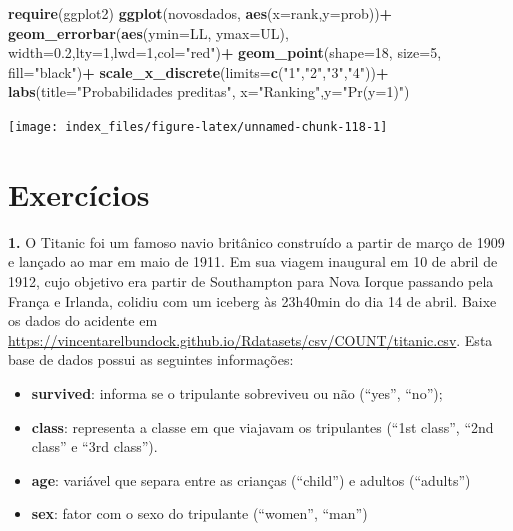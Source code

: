 \documentclass[12pt,brazil,oneside]{book}
\newenvironment{Shaded}{\begin{snugshade}}{\end{snugshade}}
\newcommand{\DataTypeTok}[1]{\textcolor[rgb]{0.13,0.29,0.53}{#1}}
\newcommand{\DecValTok}[1]{\textcolor[rgb]{0.00,0.00,0.81}{#1}}
\newcommand{\FloatTok}[1]{\textcolor[rgb]{0.00,0.00,0.81}{#1}}
\newcommand{\KeywordTok}[1]{\textcolor[rgb]{0.13,0.29,0.53}{\textbf{#1}}}
\newcommand{\NormalTok}[1]{#1}
\newcommand{\OperatorTok}[1]{\textcolor[rgb]{0.81,0.36,0.00}{\textbf{#1}}}
\newcommand{\StringTok}[1]{\textcolor[rgb]{0.31,0.60,0.02}{#1}}
\providecommand{\tightlist}{%
  \setlength{\itemsep}{0pt}\setlength{\parskip}{0pt}}
\begin{document}
\begin{Shaded}
\begin{Highlighting}[]
\KeywordTok{require}\NormalTok{(ggplot2)}
\KeywordTok{ggplot}\NormalTok{(novosdados, }\KeywordTok{aes}\NormalTok{(}\DataTypeTok{x=}\NormalTok{rank,}\DataTypeTok{y=}\NormalTok{prob))}\OperatorTok{+}
\StringTok{  }\KeywordTok{geom_errorbar}\NormalTok{(}\KeywordTok{aes}\NormalTok{(}\DataTypeTok{ymin=}\NormalTok{LL, }\DataTypeTok{ymax=}\NormalTok{UL), }\DataTypeTok{width=}\FloatTok{0.2}\NormalTok{,}\DataTypeTok{lty=}\DecValTok{1}\NormalTok{,}\DataTypeTok{lwd=}\DecValTok{1}\NormalTok{,}\DataTypeTok{col=}\StringTok{"red"}\NormalTok{)}\OperatorTok{+}
\StringTok{  }\KeywordTok{geom_point}\NormalTok{(}\DataTypeTok{shape=}\DecValTok{18}\NormalTok{, }\DataTypeTok{size=}\DecValTok{5}\NormalTok{, }\DataTypeTok{fill=}\StringTok{"black"}\NormalTok{)}\OperatorTok{+}
\StringTok{  }\KeywordTok{scale_x_discrete}\NormalTok{(}\DataTypeTok{limits=}\KeywordTok{c}\NormalTok{(}\StringTok{"1"}\NormalTok{,}\StringTok{"2"}\NormalTok{,}\StringTok{"3"}\NormalTok{,}\StringTok{"4"}\NormalTok{))}\OperatorTok{+}
\StringTok{  }\KeywordTok{labs}\NormalTok{(}\DataTypeTok{title=}\StringTok{"Probabilidades preditas"}\NormalTok{, }\DataTypeTok{x=}\StringTok{"Ranking"}\NormalTok{,}\DataTypeTok{y=}\StringTok{"Pr(y=1)"}\NormalTok{)}
\end{Highlighting}
\end{Shaded}

\begin{center}\texttt{[image: index\_files/figure-latex/unnamed-chunk-118-1]} \end{center}

\hypertarget{exercicios}{%
\section{Exercícios}\label{exercicios}}

\textbf{1.} O Titanic foi um famoso navio britânico construído a partir de março de 1909 e lançado ao mar em maio de 1911. Em sua viagem inaugural em 10 de abril de 1912, cujo objetivo era partir de Southampton para Nova Iorque passando pela França e Irlanda, colidiu com um iceberg às 23h40min do dia 14 de abril. Baixe os dados do acidente em
\url{https://vincentarelbundock.github.io/Rdatasets/csv/COUNT/titanic.csv}. Esta base de dados possui as seguintes informações:

\begin{itemize}
\tightlist
\item
  \textbf{survived}: informa se o tripulante sobreviveu ou não (``yes'', ``no'');
\item
  \textbf{class}: representa a classe em que viajavam os tripulantes (``1st class'', ``2nd class'' e ``3rd class'').
\item
  \textbf{age}: variável que separa entre as crianças (``child'') e adultos (``adults'')
\item
  \textbf{sex}: fator com o sexo do tripulante (``women'', ``man'')
\end{itemize}
\end{document}
